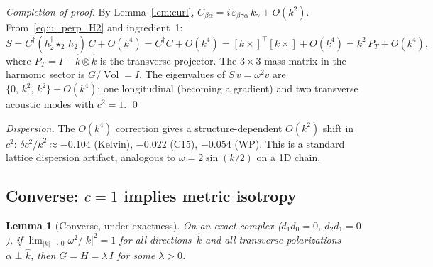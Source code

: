 \documentclass[preprint,12pt]{elsarticle}
\newtheorem{lemma}[theorem]{Lemma}
\DeclareMathOperator{\Vol}{Vol}
\begin{document}
\emph{Completion of proof.}
By Lemma~\ref{lem:curl}, $C_{\beta\alpha} = i\, \varepsilon_{\beta\gamma\alpha}\, k_\gamma + O(k^2)$.
From~\eqref{eq:u_perp_H2} and ingredient~1:
\begin{equation}
  S = C^\dagger (h_2^\dagger \star_2\, h_2)\, C + O(k^4)
    = C^\dagger C + O(k^4)
    = [k\times]^\top [k\times] + O(k^4)
    = k^2\, P_T + O(k^4),
  \label{eq:S_final}
\end{equation}
where $P_T = I - \hat{k} \otimes \hat{k}$ is the transverse projector.
The $3 \times 3$ mass matrix in the harmonic sector is $G/\Vol = I$.
The eigenvalues of $S\, v = \omega^2 v$ are
$\{0,\, k^2,\, k^2\} + O(k^4)$: one longitudinal (becoming a gradient) and
two transverse acoustic modes with $c^2 = 1$. \qed

\emph{Dispersion.}
The $O(k^4)$ correction gives a structure-dependent $O(k^2)$ shift in~$c^2$:
$\delta c^2 / k^2 \approx -0.104$ (Kelvin), $-0.022$ (C15), $-0.054$ (WP).
This is a standard lattice dispersion artifact, analogous to
$\omega = 2\sin(k/2)$ on a 1D chain.

\subsection{Converse: $c = 1$ implies metric isotropy}
\label{sec:converse}

\begin{lemma}[Converse, under exactness]
\label{lem:converse}
On an exact complex ($d_1 d_0 = 0$, $d_2 d_1 = 0$), if
$\lim_{|k|\to 0} \omega^2/|k|^2 = 1$ for all directions~$\hat{k}$ and all
transverse polarizations $\alpha \perp \hat{k}$, then
$G = H = \lambda\, I$ for some $\lambda > 0$.
\end{lemma}
\end{document}
